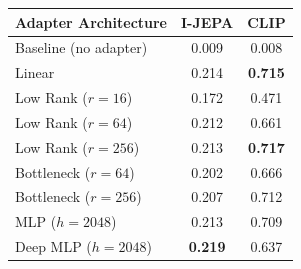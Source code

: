 \documentclass[varwidth,border=6pt]{standalone}
\begin{document}
\small
\begin{tabular}{lcc}
\toprule
Adapter Architecture & I-JEPA & CLIP \\
\midrule
Baseline (no adapter) & 0.009 & 0.008 \\
Linear & 0.214 & \textbf{0.715} \\
Low Rank ($r=16$) & 0.172 & 0.471 \\
Low Rank ($r=64$) & 0.212 & 0.661 \\
Low Rank ($r=256$) & 0.213 & \textbf{0.717} \\
Bottleneck ($r=64$) & 0.202 & 0.666 \\
Bottleneck ($r=256$) & 0.207 & 0.712 \\
MLP ($h=2048$) & 0.213 & 0.709 \\
Deep MLP ($h=2048$) & \textbf{0.219} & 0.637 \\
\bottomrule
\end{tabular}
\end{document}
